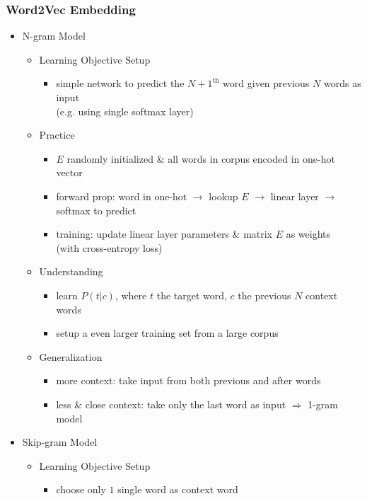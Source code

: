 \subsubsection{Word2Vec Embedding} \label{DL_NLP_Langrep_word2vec}
\begin{itemize}
\item N-gram Model
	\begin{itemize}
	\item Learning Objective Setup
		\begin{itemize}
		\item simple network to predict the $N+1^\text{th}$ word given previous $N$ words as input \\
		(e.g. using single softmax layer)
		\end{itemize}
	\item Practice
		\begin{itemize}
		\item $E$ randomly initialized \& all words in corpus encoded in one-hot vector
		\item forward prop: word in one-hot $\rightarrow$ lookup $E$ $\rightarrow$ linear layer $\rightarrow$ softmax to predict
		\item training: update linear layer parameters \& matrix $E$ as weights \\ 
		(with cross-entropy loss)
		\end{itemize}
	\item Understanding
		\begin{itemize}
		\item learn $P(t|c)$, where $t$ the target word, $c$ the previous $N$ context words
		\item setup a even larger training set from a large corpus
		\end{itemize}
	\item Generalization
		\begin{itemize}
		\item more context: take input from both previous and after words
		\item less \& close context: take only the last word as input $\Rightarrow$ 1-gram model
		\end{itemize}
	\end{itemize}
\item Skip-gram Model
	\begin{itemize}
	\item Learning Objective Setup
		\begin{itemize}
		\item choose only $1$ single word as context word \\

\end{itemize}
\end{itemize}
\end{itemize}
